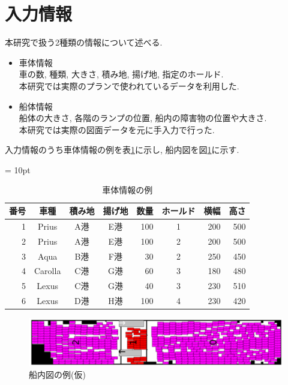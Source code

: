 \section{入力情報}
本研究で扱う2種類の情報について述べる.

\begin{itemize}
    \item 車体情報 \\
    車の数, 種類, 大きさ, 積み地, 揚げ地, 指定のホールド. \\
    本研究では実際のプランで使われているデータを利用した.
    \item 船体情報 \\
    船体の大きさ, 各階のランプの位置, 船内の障害物の位置や大きさ. \\
    本研究では実際の図面データを元に手入力で行った.

\end{itemize}
入力情報のうち車体情報の例を表\ref{table21}に示し, 船内図を図\ref{figure21}に示す.

\begin{table}[htbp]
    \tabcolsep = 10pt
    \caption{車体情報の例}
    \label{table21}
    \begin{center}
    \begin{tabular}{rcccrcrr} \hline
    番号 & 車種 & 積み地 & 揚げ地 & 数量 & ホールド & 横幅 & 高さ \\ \hline
    1 & Prius & A港 & E港 & 100 & 1 & 200 & 500 \\
    2 & Prius & A港 & E港 & 100 & 2 & 200 & 500 \\
    3 & Aqua & B港 & F港 & 30 & 2 & 250 & 450 \\
    4 & Carolla & C港 & G港 & 60 & 3 & 180 & 480 \\
    5 & Lexus & C港 & G港 & 40 & 3 & 230 & 510 \\
    6 & Lexus & D港 & H港 & 100 & 4 & 230 & 420 \\
    \hline
    \end{tabular}
    \end{center}
    \end{table}

\begin{figure}[H]
    \centering
    \includegraphics[scale=0.2]{2car_haichi.png}
    \caption{船内図の例(仮)}
    \label{figure21}
\end{figure}

